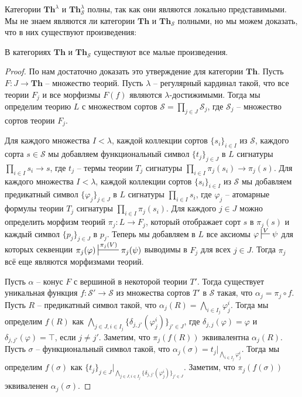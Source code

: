 \documentclass[reqno]{amsart}
\theoremstyle{definition}
\theoremstyle{remark}
\newcommand{\bcat}[1]{\mathbf{#1}}
\newcommand{\Th}{\bcat{Th}}
\begin{document}
Категории $\Th^\lambda$ и $\Th^\lambda_\mathcal{S}$ полны, так как они являются локально представимыми.
Мы не знаем являются ли категории $\Th$ и $\Th_\mathcal{S}$ полными, но мы можем доказать, что в них существуют произведения:

\begin{prop}
В категориях $\Th$ и $\Th_\mathcal{S}$ существуют все малые произведения.
\end{prop}
\begin{proof}
По  нам достаточно доказать это утверждение для категории $\Th$.
Пусть $F : J \to \Th$ -- множество теорий.
Пусть $\lambda$ -- регулярный кардинал такой, что все теории $F_j$ и все морфизмы $F(f)$ являются $\lambda$-достижимыми.
Тогда мы определим теорию $L$ с множеством сортов $\mathcal{S} = \prod_{j \in J} \mathcal{S}_j$, где $\mathcal{S}_j$ -- множество сортов теории $F_j$.

Для каждого множества $I < \lambda$, каждой коллекции сортов $\{ s_i \}_{i \in I}$ из $\mathcal{S}$, каждого сорта $s \in \mathcal{S}$ мы добавляем функциональный символ $\{ t_j \}_{j \in J}$ в $L$ сигнатуры $\prod_{i \in I} s_i \to s$,
где $t_j$ -- термы теории $T_j$ сигнатуры $\prod_{i \in I} \pi_j(s_i) \to \pi_j(s)$.
Для каждого множества $I < \lambda$, каждой коллекции сортов $\{ s_i \}_{i \in I}$ из $\mathcal{S}$ мы добавляем предикатный символ $\{ \varphi_j \}_{j \in J}$ в $L$ сигнатуры $\prod_{i \in I} s_i$,
где $\varphi_j$ -- атомарные формулы теории $T_j$ сигнатуры $\prod_{i \in I} \pi_j(s_i)$.
Для каждого $j \in J$ можно определить морфизм теорий $\pi_j : L \to F_j$, который отображает сорт $s$ в $\pi_j(s)$ и каждый символ $\{ p_j \}_{j \in J}$ в $p_j$.
Теперь мы добавляем в $L$ все аксиомы $\varphi \sststile{}{V} \psi$ для которых секвенции $\pi_j(\varphi) \sststile{}{\pi_j(V)} \pi_j(\psi)$ выводимы в $F_j$ для всех $j \in J$.
Тогда $\pi_j$ всё еще являются морфизмами теорий.

Пусть $\alpha$ -- конус $F$ с вершиной в некоторой теории $T'$.
Тогда существует уникальная функция $f : \mathcal{S}' \to \mathcal{S}$ из множества сортов $T'$ в $\mathcal{S}$ такая, что $\alpha_j = \pi_j \circ f$.
Пусть $R$ -- предикатный символ такой, что $\alpha_j(R) = \bigwedge_{i \in I_j} \varphi^i_j$.
Тогда мы определим $f(R)$ как $\bigwedge_{j \in J, i \in I_j} \{ \delta_{j,j'}(\varphi^i_j) \}_{j' \in J}$, где $\delta_{j,j}(\varphi) = \varphi$ и $\delta_{j,j'}(\varphi) = \top$, если $j \neq j'$.
Заметим, что $\pi_j(f(R))$ эквивалентна $\alpha_j(R)$.
Пусть $\sigma$ -- функциональный символ такой, что $\alpha_j(\sigma) = t_j|_{\bigwedge_{i \in I_j} \varphi^i_j}$.
Тогда мы определим $f(\sigma)$ как $\{ t_j \}_{j \in J}|_{\bigwedge_{j \in J, i \in I_j} \{ \delta_{j,j'}(\varphi^i_j) \}_{j' \in J}}$.
Заметим, что $\pi_j(f(\sigma))$ эквиваленен $\alpha_j(\sigma)$.


\end{proof}
\end{document}

